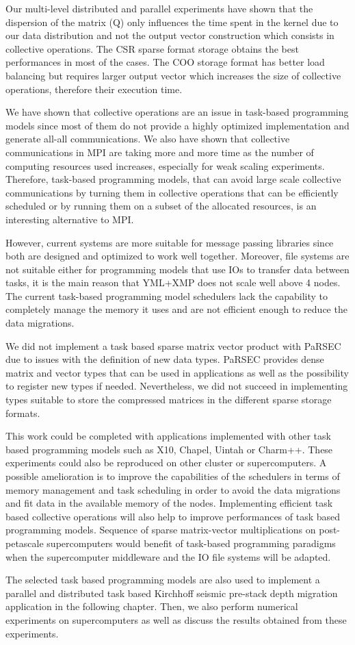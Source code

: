 Our multi-level distributed and parallel experiments have shown that the dispersion of the matrix (Q) only influences the time spent in the kernel due to our data distribution and not the output vector construction which consists in collective operations.
The CSR sparse format storage obtains the best performances in most of the cases.
The COO storage format has better load balancing but requires larger output vector which increases the size of collective operations, therefore their execution time.

We have shown that collective operations are an issue in task-based programming models since most of them do not provide a highly optimized implementation and generate all-all communications.
We also have shown that collective communications in MPI are taking more and more time as the number of computing resources used increases, especially for weak scaling experiments.
Therefore, task-based programming models, that can avoid large scale collective communications by turning them in collective operations that can be efficiently scheduled or by running them on a subset of the allocated resources, is an interesting alternative to MPI.

However, current systems are more suitable for message passing libraries since both are designed and optimized to work well together.
Moreover, file systems are not suitable either for programming models that use IOs to transfer data between tasks, it is the main reason that YML+XMP does not scale well above 4 nodes.
The current task-based programming model schedulers lack the capability to completely manage the memory it uses and are not efficient enough to reduce the data migrations.

We did not implement a task based sparse matrix vector product with PaRSEC due to issues with the definition of new data types.
PaRSEC provides dense matrix and vector types that can be used in applications as well as the possibility to register new types if needed.
Nevertheless, we did not succeed in implementing types suitable to store the compressed matrices in the different sparse storage formats.

This work could be completed with applications implemented with other task based programming models such as X10, Chapel, Uintah or Charm++.
These experiments could also be reproduced on other cluster or supercomputers.
A possible amelioration is to improve the capabilities of the schedulers in terms of memory management and task scheduling in order to avoid the data migrations and fit data in the available memory of the nodes.
Implementing efficient task based collective operations will also help to improve performances of task based programming models.
Sequence of sparse matrix-vector multiplications on post-petascale supercomputers would benefit of task-based programming paradigms when the supercomputer middleware and the IO file systems will be adapted.

The selected task based programming models are also used to implement a parallel and distributed task based Kirchhoff seismic pre-stack depth migration application in the following chapter.
Then, we also perform numerical experiments on supercomputers as well as discuss the results obtained from these experiments.

